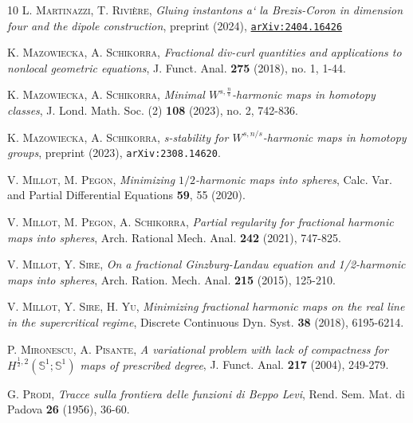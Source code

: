 \documentclass[12pt, a4paper]{article}
\newcommand{\sph}{\mathbb{S}}
\renewcommand{\(}{\left(}
\renewcommand{\)}{\right)}
\begin{document}
\begin{thebibliography}{10}
 \textsc{L. Martinazzi, T. Rivi\`ere}, \emph{Gluing instantons a` la Brezis-Coron in dimension four and the dipole construction}, preprint (2024), \href{https://arxiv.org/abs/2404.16426}{\texttt{arXiv:2404.16426}}

 \textsc{K. Mazowiecka, A. Schikorra}, \emph{Fractional div-curl quantities and applications to nonlocal geometric equations}, J. Funct. Anal. \textbf{275} (2018), no. 1, 1-44.

 \textsc{K. Mazowiecka, A. Schikorra}, \emph{Minimal $W^{s,\frac{n}{s}}$-harmonic maps in homotopy classes}, J. Lond. Math. Soc. (2) \textbf{108} (2023), no. 2, 742-836.

 \textsc{K. Mazowiecka, A. Schikorra}, \emph{s-stability for $W^{s,n/s}$-harmonic maps in homotopy groups}, preprint (2023), \texttt{arXiv:2308.14620}.


 \textsc{V. Millot, M. Pegon}, \emph{Minimizing $1/2$-harmonic maps into spheres}, Calc. Var. and Partial Differential Equations \textbf{59}, 55 (2020).

 \textsc{V. Millot, M. Pegon, A. Schikorra}, \emph{Partial regularity for fractional harmonic maps into spheres}, Arch. Rational Mech. Anal. \textbf{242} (2021), 747-825.

 \textsc{V. Millot, Y. Sire}, \emph{On a fractional Ginzburg-Landau equation and 1/2-harmonic maps into spheres}, Arch. Ration. Mech. Anal. \textbf{215} (2015), 125-210.

 \textsc{V. Millot, Y. Sire, H. Yu}, \emph{Minimizing fractional harmonic maps on the real line in the supercritical regime}, Discrete Continuous Dyn. Syst. \textbf{38} (2018), 6195-6214.

 \textsc{P. Mironescu, A. Pisante}, \emph{A variational problem with lack of compactness for $H^{\frac12,2}(\sph^1;\sph^1)$ maps of prescribed degree}, J. Funct. Anal. \textbf{217} (2004), 249-279.

 \textsc{G. Prodi}, \emph{Tracce sulla frontiera delle funzioni di Beppo Levi}, Rend. Sem. Mat. di Padova \textbf{26} (1956), 36-60. 



\end{thebibliography}
\end{document}
